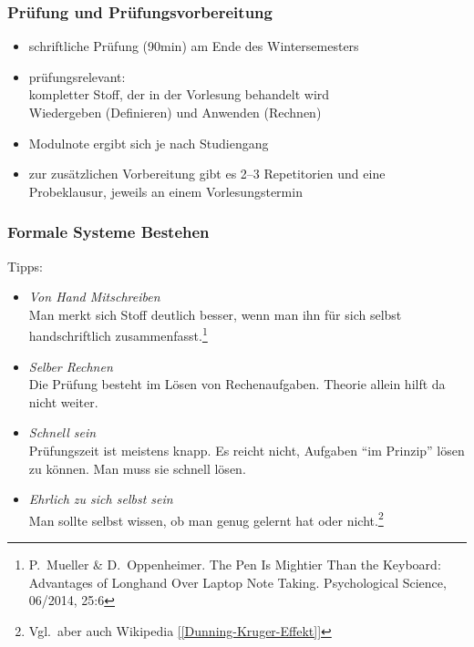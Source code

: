 \documentclass[onlymath]{beamer}
\begin{document}
\begin{frame}\frametitle{Prüfung und Prüfungsvorbereitung}
\begin{itemize}
\item schriftliche Prüfung (90min) am Ende des Wintersemesters
\item prüfungsrelevant:\\
	kompletter Stoff, der in der Vorlesung behandelt wird\\
	Wiedergeben (Definieren) \alert{und} Anwenden (Rechnen)
\item Modulnote ergibt sich je nach Studiengang
\item zur zusätzlichen Vorbereitung gibt es \alert{2--3 Repetitorien} und \alert{eine Probeklausur}, jeweils an einem Vorlesungstermin
\end{itemize}

\end{frame}


\begin{frame}\frametitle{Formale Systeme Bestehen}
Tipps:
\begin{itemize}
\item \emph{Von Hand Mitschreiben}\\
	{\footnotesize Man merkt sich Stoff deutlich besser, wenn man ihn für sich selbst handschriftlich
	zusammenfasst.\footnote{\tiny P.\ Mueller \& D.\ Oppenheimer. The Pen Is Mightier Than the Keyboard: Advantages of Longhand Over Laptop Note Taking. Psychological Science, 06/2014, 25:6}}
\item \emph{Selber Rechnen}\\
	{\footnotesize Die Prüfung besteht im Lösen von Rechenaufgaben. Theorie allein hilft da nicht weiter.}
\item \emph{Schnell sein}\\
	{\footnotesize Prüfungszeit ist meistens knapp. Es reicht nicht, Aufgaben "`im Prinzip"' lösen zu können. Man muss sie schnell lösen.}
\item \emph{Ehrlich zu sich selbst sein}\\
	{\footnotesize Man sollte selbst wissen, ob man genug gelernt hat oder nicht.\footnote{\tiny Vgl.\ aber auch Wikipedia \href{https://de.wikipedia.org/wiki/Dunning-Kruger-Effekt}{[[Dunning-Kruger-Effekt]]}}}
\end{itemize}

\end{frame}



\newcommand{\qaline}[2]{\alert{#1}\\\hfill\pause \textcolor{darkred}{#2}\\[1.5ex]}
\end{document}
